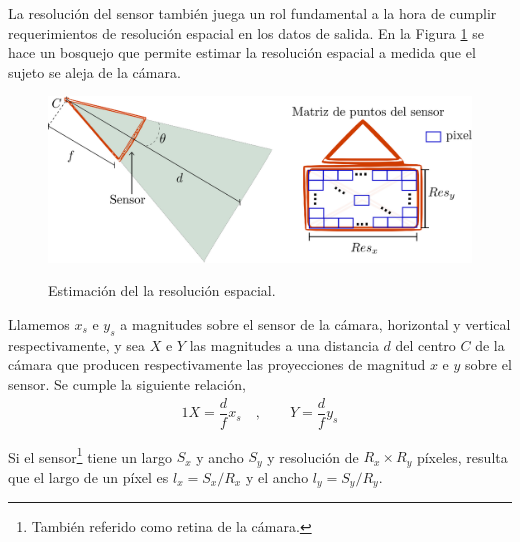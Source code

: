  
 La resolución del sensor también juega un rol fundamental a la hora de cumplir requerimientos de resolución espacial en los datos de salida.
 En la Figura \ref{estimacion_resolucion} se hace un bosquejo que permite estimar la resolución espacial a medida que el sujeto se aleja de la cámara.
 
\begin{figure}[H]
  \centering
  {\includegraphics[scale=0.5]{img/Base_Datos/camara_resolucion.eps}}      
  \caption{Estimación del la resolución espacial.}
  \label{estimacion_resolucion}
\end{figure} 

Llamemos $x_s$ e $y_s$ a magnitudes sobre el sensor de la cámara, horizontal y vertical respectivamente, y sea $X$ e $Y$ las magnitudes a una distancia $d$ del centro $C$ de la cámara que producen respectivamente las proyecciones de magnitud $x$ e $y$ sobre el sensor.
Se cumple la siguiente relación,
\begin{alignat*}{1}
X = \dfrac{d}{f}x_s&~, \quad \quad Y = \dfrac{d}{f}y_s
\end{alignat*}

Si el sensor\footnote{También referido como retina de la cámara.} tiene un largo $S_x$ y ancho $S_y$ y resolución de $R_x\times R_y$ píxeles, resulta que el largo de un píxel es $l_x = S_x/R_x $ y el ancho $l_y = S_y/ R_y$. 

